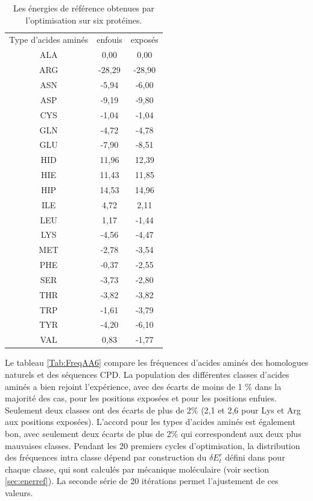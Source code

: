     \begin{table}[!htbp]
      \centering
      \caption{Les énergies de référence obtenues par l'optimisation sur six protéines.}
      \begin{tabular}{ccc}

        \toprule
        Type d'acides aminés & enfouis & exposés \\
        \cmidrule{1-3}

        ALA & 0,00     &  0,00     \\
        ARG & -28,29   &  -28,90   \\
        ASN & -5,94    &  -6,00    \\
        ASP & -9,19    &  -9,80    \\
        CYS & -1,04    &  -1,04    \\
        GLN & -4,72    &  -4,78    \\
        GLU & -7,90    &  -8,51    \\
        HID & 11,96    &  12,39    \\
        HIE & 11,43    &  11,85    \\
        HIP & 14,53    &  14,96    \\
        ILE & 4,72     &  2,11     \\
        LEU & 1,17     &  -1,44    \\
        LYS & -4,56    &  -4,47    \\
        MET & -2,78    &  -3,54    \\
        PHE & -0,37    &  -2,55    \\
        SER & -3,73    &  -2,80    \\
        THR & -3,82    &  -3,82    \\
        TRP & -1,61    &  -3,79    \\
        TYR & -4,20    &  -6,10    \\
        VAL & 0,83     &  -1,77    \\

        \bottomrule
      \end{tabular}      

\label{tab:RefEner6}      
    \end{table}

Le tableau \ref{Tab:FreqAA6} compare les fréquences d'acides aminés des homologues naturels et des séquences CPD. La population des différentes classes d'acides aminés a bien rejoint l'expérience, avec des écarts de moins de 1 \% dans la majorité des cas, pour les positions exposées et pour les positions enfuies. Seulement deux classes ont des écarts de plus de 2\% (2,1 et 2,6 pour Lys et Arg aux positions exposées). L'accord pour les types d'acides aminés est également bon, avec seulement deux écarts de plus de 2\% qui correspondent aux deux plus mauvaises classes. Pendant les 20 premiers cycles d'optimisation, la distribution des fréquences intra classe dépend par construction du $\delta E_t^r$ défini dans pour chaque classe, qui sont calculés par mécanique moléculaire (voir section \ref{sec:enerref}). La seconde série de 20 itérations permet l'ajustement de ces valeurs. 
    
